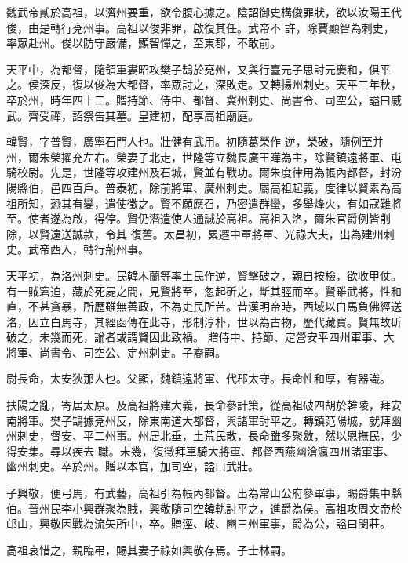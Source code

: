 \begin{pinyinscope}
 魏武帝貳於高祖，以濟州要重，欲令腹心據之。陰詔御史構俊罪狀，欲以汝陽王代俊，由是轉行兗州事。高祖以俊非罪，啟復其任。武帝不
 許，除賈顯智為刺史，率眾赴州。俊以防守嚴備，顯智憚之，至東郡，不敢前。



 天平中，為都督，隨領軍婁昭攻樊子鵠於兗州，又與行臺元子思討元慶和，俱平之。侯深反，復以俊為大都督，率眾討之，深敗走。又轉揚州刺史。天平三年秋，卒於州，時年四十二。贈持節、侍中、都督、冀州刺史、尚書令、司空公，謚曰威武。齊受禪，詔祭告其墓。皇建初，配享高祖廟庭。



 韓賢，字普賢，廣寧石門人也。壯健有武用。初隨葛榮作
 逆，榮破，隨例至并州，爾朱榮擢充左右。榮妻子北走，世隆等立魏長廣王曄為主，除賢鎮遠將軍、屯騎校尉。先是，世隆等攻建州及石城，賢並有戰功。爾朱度律用為帳內都督，封汾陽縣伯，邑四百戶。普泰初，除前將軍、廣州刺史。屬高祖起義，度律以賢素為高祖所知，恐其有變，遣使徵之。賢不願應召，乃密遣群蠻，多舉烽火，有如寇難將至。使者遂為啟，得停。賢仍潛遣使人通誠於高祖。高祖入洛，爾朱官爵例皆削除，以賢遠送誠款，令其
 復舊。太昌初，累遷中軍將軍、光祿大夫，出為建州刺史。武帝西入，轉行荊州事。



 天平初，為洛州刺史。民韓木蘭等率土民作逆，賢擊破之，親自按檢，欲收甲仗。有一賊窘迫，藏於死屍之間，見賢將至，忽起斫之，斷其脛而卒。賢雖武將，性和直，不甚貪暴，所歷雖無善政，不為吏民所苦。昔漢明帝時，西域以白馬負佛經送洛，因立白馬寺，其經函傳在此寺，形制淳朴，世以為古物，歷代藏寶。賢無故斫破之，未幾而死，論者或謂賢因此致禍。
 贈侍中、持節、定營安平四州軍事、大將軍、尚書令、司空公、定州刺史。子裔嗣。



 尉長命，太安狄那人也。父顯，魏鎮遠將軍、代郡太守。長命性和厚，有器識。



 扶陽之亂，寄居太原。及高祖將建大義，長命參計策，從高祖破四胡於韓陵，拜安南將軍。樊子鵠據兗州反，除東南道大都督，與諸軍討平之。轉鎮范陽城，就拜幽州剌史，督安、平二州事。州居北垂，土荒民散，長命雖多聚斂，然以恩撫民，少得安集。尋以疾去
 職。未幾，復徵拜車騎大將軍、都督西燕幽滄瀛四州諸軍事、幽州刺史。卒於州。贈以本官，加司空，謚曰武壯。



 子興敬，便弓馬，有武藝，高祖引為帳內都督。出為常山公府參軍事，賜爵集中縣伯。晉州民李小興群聚為賊，興敬隨司空韓軌討平之，進爵為侯。高祖攻周文帝於邙山，興敬因戰為流矢所中，卒。贈涇、岐、豳三州軍事，爵為公，謚曰閔莊。



 高祖哀惜之，親臨弔，賜其妻子祿如興敬存焉。子士林嗣。




\end{pinyinscope}
